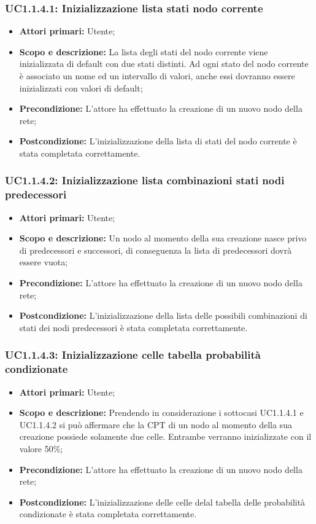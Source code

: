 \subsubsection{UC1.1.4.1: Inizializzazione lista stati nodo corrente} 
\begin{itemize} 
	\item{\textbf{Attori primari:} Utente;} 
	\item{\textbf{Scopo e descrizione:} La lista degli stati del nodo corrente viene inizializzata di default con due stati distinti. Ad ogni stato del nodo corrente è associato un nome ed un intervallo di valori, anche essi dovranno essere inizializzati con valori di default;} 
	\item{\textbf{Precondizione:} L'attore ha effettuato la creazione di un nuovo nodo della rete;} 
	\item{\textbf{Postcondizione:} L'inizializzazione della lista di stati del nodo corrente è stata completata correttamente.} 
\end{itemize} 
\subsubsection{UC1.1.4.2: Inizializzazione lista combinazioni stati nodi predecessori} 
\begin{itemize} 
	\item{\textbf{Attori primari:} Utente;} 
	\item{\textbf{Scopo e descrizione:} Un nodo al momento della sua creazione nasce privo di predecessori e successori, di conseguenza la lista di predecessori dovrà essere vuota;} 
	\item{\textbf{Precondizione:} L'attore ha effettuato la creazione di un nuovo nodo della rete;} 
	\item{\textbf{Postcondizione:} L'inizializzazione della lista delle possibili combinazioni di stati dei nodi predecessori è stata completata correttamente.} 
\end{itemize} 
\subsubsection{UC1.1.4.3: Inizializzazione celle tabella probabilità condizionate} 
\begin{itemize} 
	\item{\textbf{Attori primari:} Utente;} 
	\item{\textbf{Scopo e descrizione:} Prendendo in considerazione i sottocasi UC1.1.4.1 e UC1.1.4.2 si può affermare che la CPT di un nodo al momento della sua creazione possiede solamente due celle. Entrambe verranno inizializzate con il valore 50\%;} 
	\item{\textbf{Precondizione:} L'attore ha effettuato la creazione di un nuovo nodo della rete;} 
	\item{\textbf{Postcondizione:} L'inizializzazione delle celle delal tabella delle probabilità condizionate è stata completata correttamente.} 
\end{itemize} 
